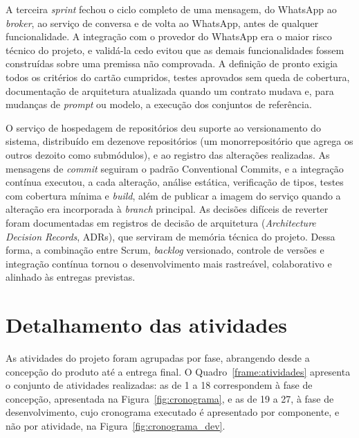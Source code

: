 A terceira \textit{sprint} fechou o ciclo completo de uma mensagem, do WhatsApp ao \textit{broker}, ao serviço de conversa e de volta ao WhatsApp, antes de qualquer funcionalidade. A integração com o provedor do WhatsApp era o maior risco técnico do projeto, e validá-la cedo evitou que as demais funcionalidades fossem construídas sobre uma premissa não comprovada. A definição de pronto exigia todos os critérios do cartão cumpridos, testes aprovados sem queda de cobertura, documentação de arquitetura atualizada quando um contrato mudava e, para mudanças de \textit{prompt} ou modelo, a execução dos conjuntos de referência.

O serviço de hospedagem de repositórios deu suporte ao versionamento do sistema, distribuído em dezenove repositórios (um monorrepositório que agrega os outros dezoito como submódulos), e ao registro das alterações realizadas. As mensagens de \textit{commit} seguiram o padrão Conventional Commits, e a integração contínua executou, a cada alteração, análise estática, verificação de tipos, testes com cobertura mínima e \textit{build}, além de publicar a imagem do serviço quando a alteração era incorporada à \textit{branch} principal. As decisões difíceis de reverter foram documentadas em registros de decisão de arquitetura (\textit{Architecture Decision Records}, ADRs), que serviram de memória técnica do projeto. Dessa forma, a combinação entre Scrum, \textit{backlog} versionado, controle de versões e integração contínua tornou o desenvolvimento mais rastreável, colaborativo e alinhado às entregas previstas.

\section{Detalhamento das atividades}

As atividades do projeto foram agrupadas por fase, abrangendo desde a concepção do produto até a entrega final. O Quadro~\ref{frame:atividades} apresenta o conjunto de atividades realizadas: as de 1 a 18 correspondem à fase de concepção, apresentada na Figura~\ref{fig:cronograma}, e as de 19 a 27, à fase de desenvolvimento, cujo cronograma executado é apresentado por componente, e não por atividade, na Figura~\ref{fig:cronograma_dev}.

